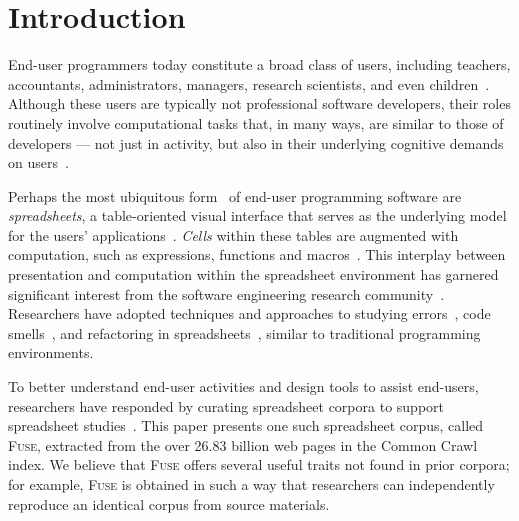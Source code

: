 \documentclass[conference]{IEEEtran}
\begin{document}

\section{Introduction}

End-user programmers today constitute a broad class of users, including teachers, accountants, administrators, managers, research scientists, and even children~\cite{Ko2011}.
%
Although these users are typically not professional software developers, their roles routinely involve computational tasks that, in many ways, are similar to those of developers --- not just in activity, but also in their underlying cognitive demands on users~\cite{Blackwell2002}. 

Perhaps the most ubiquitous form~\cite{Scaffidi2005} of end-user programming software are \emph{spreadsheets}, a table-oriented visual interface that serves as the underlying model for the users' applications~\cite{Nardi1990}. \emph{Cells} within these tables are augmented with computation, such as expressions, functions and macros~\cite{Nardi1990}. 
This interplay between presentation and computation within the spreadsheet environment has garnered significant interest from the software engineering research community~\cite{Burnett2009}. 
Researchers have adopted techniques and approaches to studying errors~\cite{Powell2008}, code smells~\cite{Pinzger2012}, and refactoring in spreadsheets~\cite{Badame2012}, similar to traditional programming environments. 


To better understand end-user activities and design tools to assist end-users, researchers have responded by curating spreadsheet corpora to support spreadsheet studies~\cite{Fisher2005,Hermans2015,Chen2013}. This paper presents one such spreadsheet corpus, called \textsc{Fuse}, extracted from the over 26.83 billion web pages in the Common Crawl index. We believe that \textsc{Fuse} offers several useful traits not found in prior corpora; 
for example, \textsc{Fuse} is obtained in such a way that researchers can independently reproduce an identical corpus from source materials.
\end{document}
